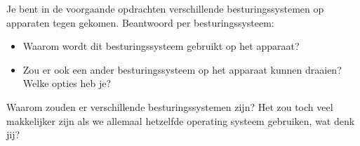 Je bent in de voorgaande opdrachten verschillende besturingssystemen op apparaten tegen gekomen. Beantwoord per besturingssysteem:
\begin{itemize}
\item Waarom wordt dit besturingssysteem gebruikt op het apparaat?
\item Zou er ook een ander besturingssysteem op het apparaat kunnen draaien? Welke opties heb je?
\end{itemize}

Waarom zouden er verschillende besturingssystemen zijn? Het zou toch veel makkelijker zijn als we allemaal hetzelfde operating systeem gebruiken, wat denk jij?

